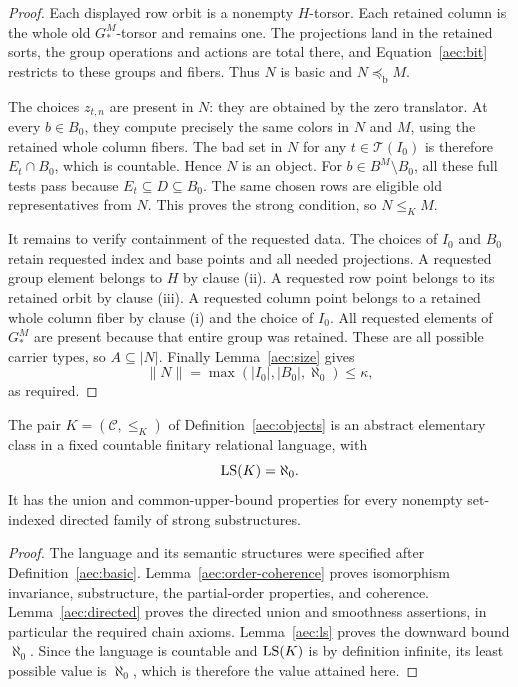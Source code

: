 \begin{proof}
Each displayed row orbit is a nonempty
\(H\)-torsor.  Each retained column is the
whole old \(G_*^M\)-torsor and remains one.
The projections land in the retained sorts,
the group operations and actions are total
there, and Equation~\eqref{aec:bit} restricts
to these groups and fibers.  Thus \(N\) is
basic and \(N\preccurlyeq_{\mathrm b}M\).

The choices \(z_{t,n}\) are present in \(N\):
they are obtained by the zero translator.
At every \(b\in B_0\), they compute precisely
the same colors in \(N\) and \(M\), using the
retained whole column fibers.  The bad set in
\(N\) for any \(t\in\mathcal T(I_0)\) is
therefore \(E_t\cap B_0\), which is countable.
Hence \(N\) is an object.
For \(b\in B^M\setminus B_0\), all these
full tests pass because \(E_t\subseteq D
\subseteq B_0\).  The same chosen rows are
eligible old representatives from \(N\).
This proves the strong condition, so
\(N\le_K M\).

It remains to verify containment of the
requested data.  The choices of \(I_0\)
and \(B_0\) retain requested index and base
points and all needed projections.  A
requested group element belongs to \(H\)
by clause (ii).  A requested row point
belongs to its retained orbit by clause
(iii).  A requested column point belongs
to a retained whole column fiber by
clause (i) and the choice of \(I_0\).
All requested elements of \(G_*^M\)
are present because that entire group was
retained.  These are all possible carrier
types, so \(A\subseteq |N|\).
Finally Lemma~\ref{aec:size} gives
\[
 \|N\|=\max(|I_0|,|B_0|,\aleph_0)
       \le\kappa,
\]
as required.
\end{proof}

\begin{theorem}\label{aec:class}
The pair \(K=(\mathcal C,\le_K)\) of
Definition~\ref{aec:objects} is an abstract
elementary class in a fixed countable finitary
relational language, with
\[
 \operatorname{LS}(K)=\aleph_0.
\]
It has the union and common-upper-bound
properties for every nonempty set-indexed
directed family of strong substructures.
\end{theorem}

\begin{proof}
The language and its semantic structures were
specified after Definition~\ref{aec:basic}.
Lemma~\ref{aec:order-coherence} proves
isomorphism invariance, substructure, the
partial-order properties, and coherence.
Lemma~\ref{aec:directed} proves the directed
union and smoothness assertions, in
particular the required chain axioms.
Lemma~\ref{aec:ls} proves the downward
bound \(\aleph_0\).  Since the language is
countable and \(\operatorname{LS}(K)\) is by definition
infinite, its least possible value is
\(\aleph_0\), which is therefore the value
attained here.
\end{proof}
